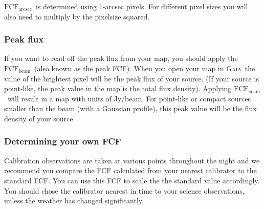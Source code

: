 \documentclass[twoside,11pt]{article}
\newcommand{\xref}[3]{#1}
\renewcommand{\_}{\texttt{\symbol{95}}}
\newcommand{\fcfb}{$\mathrm{FCF_{beam}}$}
\newcommand{\fcfa}{$\mathrm{FCF_{arcsec}}$}
\newcommand{\gaia}{\xref{\textsc{Gaia}}{sun214}{}}
\begin{document}
\fcfa\ is determined using 1-arcsec pixels. For different pixel sizes
you will also need to multiply by the pixelsize squared.

\subsubsection{Peak flux}

If you want to read off the peak flux from your map, you should apply
the \fcfb\ (also known as the peak FCF).  When you open your map in
\gaia\ the value of the brightest pixel will be the peak flux of your
source. (If your source is point-like, the peak value in the map is
the total flux density). Applying \fcfb\ will result in a map with
units of Jy/beam. For point-like or compact sources smaller than the
beam (with a Gaussian profile), this peak value will be the flux
density of your source.

\subsubsection{Determining your own FCF}

Calibration observations are taken at various points throughout the
night and we recommend you compare the FCF calculated from your
nearest calibrator to the standard FCF. You can use this FCF to scale
the the standard value accordingly. You should chose the calibrator
nearest in time to your science observations, unless the weather has
changed significantly.
\end{document}
